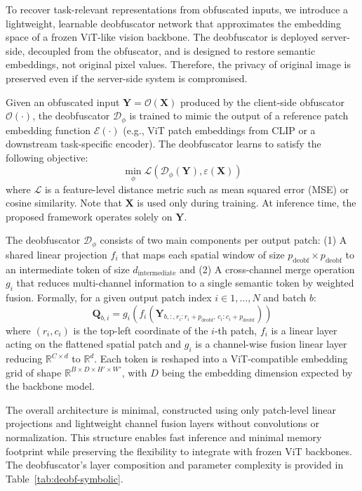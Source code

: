 \documentclass{ieeeaccess}
\begin{document}
To recover task-relevant representations from obfuscated inputs, we introduce a lightweight, learnable deobfuscator network that approximates the embedding space of a frozen ViT-like vision backbone. The deobfuscator is deployed server-side, decoupled from the obfuscator, and is designed to restore semantic embeddings, not original pixel values. Therefore, the privacy of original image is preserved even if the server-side system is compromised.

Given an obfuscated input $\mathbf{Y} = \mathcal{O}(\mathbf{X})$ produced by the client-side obfuscator $\mathcal{O}(\cdot)$, the deobfuscator $\mathcal{D}_\phi$ is trained to mimic the output of a reference patch embedding function $\mathcal{E}(\cdot)$ (e.g., ViT patch embeddings from CLIP or a downstream task-specific encoder). The deobfuscator learns to satisfy the following objective:
\begin{equation}
    \min_{\phi} \mathcal{L}(\mathcal{D}_\phi(\mathbf{Y}),\varepsilon(\mathbf{X}))
\end{equation}
where $\mathcal{L}$ is a feature-level distance metric such as mean squared error (MSE) or cosine similarity. Note that $\mathbf{X}$ is used only during training. At inference time, the proposed framework operates solely on $\mathbf{Y}$.

The deobfuscator $\mathcal{D}_\phi$ consists of two main components per output patch: (1) A shared linear projection $f_i$ that maps each spatial window of size $p_{\text{deobf}} \times p_{\text{deobf}}$ to an intermediate token of size $d_{\text{intermediate}}$ and (2) A cross-channel merge operation $g_i$ that reduces multi-channel information to a single semantic token by weighted fusion. Formally, for a given output patch index $i \in {1, \dots, N}$ and batch $b$:
\begin{equation}
    \mathbf{Q}_{b,i} = g_i\left( f_i\left( \mathbf{Y}_{b,:,r_i:r_i+p_{\text{deobf}},\,c_i:c_i+p_{\text{deobf}}} \right) \right)
\end{equation}
where $(r_i, c_i)$ is the top-left coordinate of the $i$-th patch, $f_i$ is a linear layer acting on the flattened spatial patch and $g_i$ is a channel-wise fusion linear layer reducing $\mathbb{R}^{C \times d}$ to $\mathbb{R}^{d}$. Each token is reshaped into a ViT-compatible embedding grid of shape $\mathbb{R}^{B \times D \times H' \times W'}$, with $D$ being the embedding dimension expected by the backbone model.

The overall architecture is minimal, constructed using only patch-level linear projections and lightweight channel fusion layers without convolutions or normalization. This structure enables fast inference and minimal memory footprint while preserving the flexibility to integrate with frozen ViT backbones. The deobfuscator’s layer composition and parameter complexity is provided in Table~\ref{tab:deobf-symbolic}.
\end{document}
